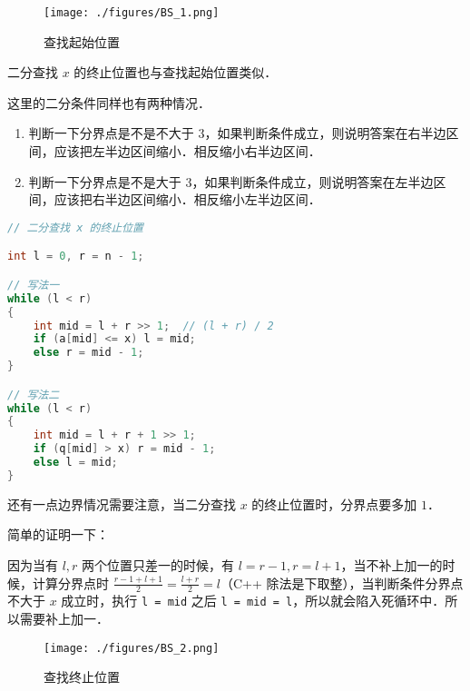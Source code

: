 \begin{figure}[ht]
\centering
\texttt{[image: ./figures/BS\_1.png]}
\caption{查找起始位置} \label{BS_fig1}
\end{figure}


二分查找 $x$ 的终止位置也与查找起始位置类似．

这里的二分条件同样也有两种情况．

\begin{enumerate}
\item 判断一下分界点是不是不大于 $3$，如果判断条件成立，则说明答案在右半边区间，应该把左半边区间缩小．相反缩小右半边区间．
\item 判断一下分界点是不是大于 $3$，如果判断条件成立，则说明答案在左半边区间，应该把右半边区间缩小．相反缩小左半边区间．
\end{enumerate}
\begin{lstlisting}[language=cpp]
// 二分查找 x 的终止位置

int l = 0, r = n - 1;

// 写法一
while (l < r)
{
	int mid = l + r >> 1;  // (l + r) / 2
    if (a[mid] <= x) l = mid;
    else r = mid - 1;
}

// 写法二
while (l < r)
{
    int mid = l + r + 1 >> 1;
    if (q[mid] > x) r = mid - 1;
    else l = mid;
}
\end{lstlisting}



还有一点边界情况需要注意，当二分查找 $x$ 的终止位置时，分界点要多加 $1$．

简单的证明一下：

因为当有 $l, r$ 两个位置只差一的时候，有 $l = r - 1, r = l + 1$，当不补上加一的时候，计算分界点时 $\frac{r - 1 + l + 1}{2} = \frac{l+r}{2}=l$（C++ 除法是下取整），当判断条件分界点不大于 $x$ 成立时，执行 \verb|l = mid| 之后 \verb|l = mid = l|，所以就会陷入死循环中．所以需要补上加一．

\begin{figure}[ht]
\centering
\texttt{[image: ./figures/BS\_2.png]}
\caption{查找终止位置} \label{BS_fig2}
\end{figure}
